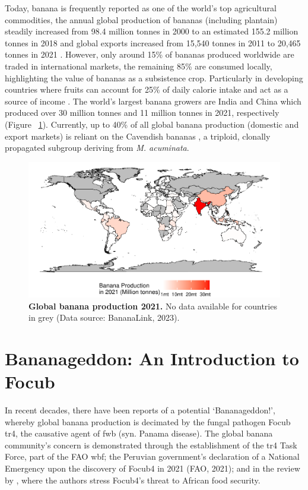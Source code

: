 Today, banana is frequently reported as one of the world’s top agricultural commodities, the annual global production of bananas (including plantain) steadily increased from 98.4 million tonnes in 2000 to an estimated 155.2 million tonnes in 2018  and global exports increased from 15,540 tonnes in 2011 to 20,465 tonnes in 2021 \parencite{FAO2022}. However, only around 15\% of bananas produced worldwide are traded in international markets, the remaining 85\% are consumed locally, highlighting the value of bananas as a subsistence crop. Particularly in developing countries where fruits can account for 25\% of daily calorie intake and act as a source of income \parencite{FAO2019}. The world’s largest banana growers are India and China which produced over 30 million tonnes and 11 million tonnes in 2021, respectively \parencite{BananaLink2023} (Figure ~\ref{fig:bananaProdMap}).  Currently, up to 40\% of all global banana production (domestic and export markets) is reliant on the Cavendish bananas \parencite{Warman2018}, a triploid, clonally propagated subgroup deriving from \textit{M. acuminata}.

\begin{figure}[h!]
    \centering
    \includegraphics[width=15cm]{Figures/BananaProdMap.pdf}
    \caption[Global banana production, 2021]{\textbf{Global banana production 2021.} No data available for countries in grey  (Data source: BananaLink, 2023).}
    \label{fig:bananaProdMap}
\end{figure}



\section{Bananageddon: An Introduction to \acl{Focub}}

In recent decades, there have been reports of a potential ‘Bananageddon!’, whereby global banana production is decimated by the fungal pathogen \acf{Focub} \acf{tr4}, the causative agent of \acf{fwb} (syn. Panama disease). The global banana community’s concern is demonstrated through the establishment of the \acs{tr4} Task Force, part of the \ac{FAO} \ac{wbf}; the Peruvian government’s declaration of a National Emergency upon the discovery of \ac{Focub4} in 2021 (FAO, 2021); and in the review by \textcite{Westerhoven2022}, where the authors stress \ac{Focub4}'s threat to African food security.   


